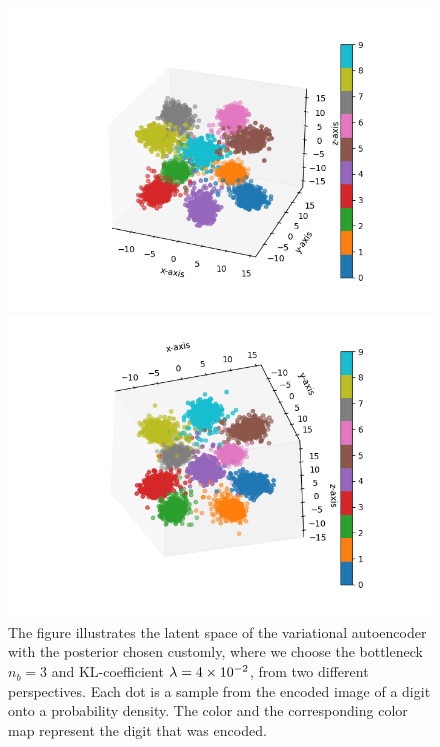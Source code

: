 \begin{figure}
\begin{center}
   \begin{minipage}[b]{0.49\linewidth}
      \includegraphics[trim = 20mm 10mm 20mm 10mm, clip, width=\linewidth]{convolutional_VAE_new_idea_KL_4e-2_10k_epochs_3D_latent_1}
	\end{minipage}
   \begin{minipage}[b]{0.49\linewidth}
      \includegraphics[trim = 20mm 10mm 20mm 10mm, clip, width=\linewidth]{convolutional_VAE_new_idea_KL_4e-2_10k_epochs_3D_latent_2}
	\end{minipage}
\end{center}
\caption{The figure illustrates the latent space of the variational autoencoder with the posterior chosen customly, where we choose the bottleneck $n_b=3$ and KL-coefficient $\lambda = \num{4e-2}$, from two different perspectives. Each dot is a sample from the encoded image of a digit onto a probability density. The color and the corresponding color map represent the digit that was encoded.}\label{fig:convolutional_VAE_new_idea_KL_4e-2_10k_epochs_3D_latent}
\end{figure}

